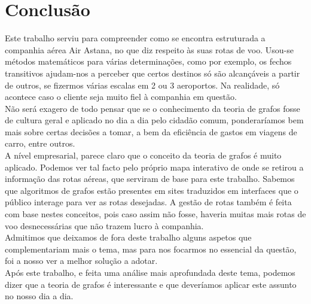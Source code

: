 \chapter{Conclusão}
Este trabalho serviu para compreender como se encontra estruturada a companhia aérea Air Astana, no que diz respeito às suas rotas de voo. Usou-se métodos matemáticos para várias determinações, como por exemplo, os fechos transitivos ajudam-nos a perceber que certos destinos só são alcançáveis a partir de outros, se fizermos várias escalas em 2 ou 3 aeroportos. Na realidade, só acontece caso o cliente seja muito fiel à companhia em questão.\\
Não será exagero de todo pensar que se o conhecimento da teoria de grafos fosse de cultura geral e aplicado no dia a dia pelo cidadão comum, ponderaríamos bem mais sobre certas decisões a tomar, a bem da eficiência de gastos em viagens de carro, entre outros.\\
A nível empresarial, parece claro que o conceito da teoria de grafos é muito aplicado. Podemos ver tal facto pelo próprio mapa interativo de onde se retirou a informação das rotas aéreas, que serviram de base para este trabalho. Sabemos que algoritmos de grafos estão presentes em sites traduzidos em interfaces que o público interage para ver as rotas desejadas. A gestão de rotas também é feita com base nestes conceitos, pois caso assim não fosse, haveria muitas mais rotas de voo desnecessárias que não trazem lucro à companhia.\\
Admitimos que deixamos de fora deste trabalho alguns aspetos que complementariam mais o tema, mas para nos focarmos no essencial da questão, foi a nosso ver a melhor solução a adotar.\\
Após este trabalho, e feita uma análise mais aprofundada deste tema, podemos dizer que a teoria de grafos é interessante e que deveríamos aplicar este assunto no nosso dia a dia.